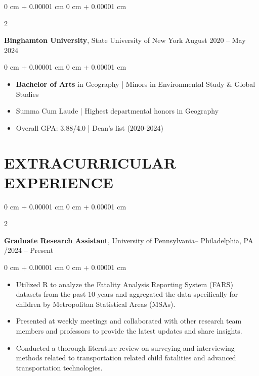 \documentclass[10pt, letterpaper]{article}
\newenvironment{highlights}{
    \begin{itemize}[
        topsep=0.10 cm,
        parsep=0.10 cm,
        partopsep=0pt,
        itemsep=0pt,
        leftmargin=0 cm + 10pt
    ]
}{
    \end{itemize}
} %
\newenvironment{onecolentry}{
    \begin{adjustwidth}{
        0 cm + 0.00001 cm
    }{
        0 cm + 0.00001 cm
    }
}{
    \end{adjustwidth}
} %
\newenvironment{twocolentry}[2][]{
    \onecolentry
    \def\secondColumn{#2}
    \setcolumnwidth{\fill, 4.5 cm}
    \begin{paracol}{2}
}{
    \switchcolumn \raggedleft \secondColumn
    \end{paracol}
    \endonecolentry
} %
\begin{document}
        \begin{twocolentry}{
            August 2020 – May 2024
        }
            \textbf{Binghamton University}, State University of New York\end{twocolentry}

        \vspace{0.10 cm}
        \begin{onecolentry}
            \begin{highlights}
                \item \textbf{Bachelor of Arts} in Geography | Minors in Environmental Study \& Global Studies
                \item  Summa Cum Laude | Highest departmental honors in Geography
                \item  Overall GPA: 3.88/4.0 | Dean’s list (2020-2024)
            \end{highlights}
        \end{onecolentry}


    
    \section{\textbf{EXTRACURRICULAR EXPERIENCE }
}



        
        \begin{twocolentry}{
            10/2024 – Present
        }
\textbf{Graduate Research Assistant}, University of Pennsylvania-- Philadelphia, PA\end{twocolentry}

        \vspace{0.10 cm}
        \begin{onecolentry}
            \begin{highlights}
                \item Utilized R to analyze the Fatality Analysis Reporting System (FARS) datasets from the past 10 years and aggregated the data specifically for children by Metropolitan Statistical Areas (MSAs).
                \item Presented at weekly meetings and collaborated with other research team members and professors to provide the latest updates and share insights.
                \item Conducted a thorough literature review on surveying and interviewing methods related to transportation related child fatalities and advanced transportation technologies.
            \end{highlights}
        \end{onecolentry}
\end{document}
